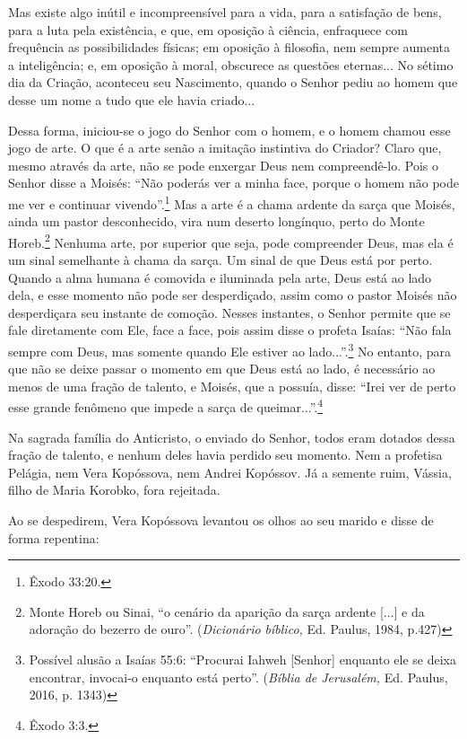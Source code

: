 Mas existe algo inútil e incompreensível para a vida, para a satisfação
de bens, para a luta pela existência, e que, em oposição à ciência,
enfraquece com frequência as possibilidades físicas; em oposição à
filosofia, nem sempre aumenta a inteligência; e, em oposição à moral,
obscurece as questões eternas... No sétimo dia da Criação, aconteceu seu
Nascimento, quando o Senhor pediu ao homem que desse um nome a tudo que
ele havia criado...

Dessa forma, iniciou-se o jogo do Senhor com o homem, e o homem chamou
esse jogo de arte. O que é a arte senão a imitação instintiva do
Criador? Claro que, mesmo através da arte, não se pode enxergar Deus nem
compreendê-lo. Pois o Senhor disse a Moisés: ``Não poderás ver a minha
face, porque o homem não pode me ver e continuar vivendo''.\footnote{Êxodo
  33:20.} Mas a arte é a chama ardente da sarça que Moisés, ainda um
pastor desconhecido, vira num deserto longínquo, perto do Monte
Horeb.\footnote{Monte Horeb ou Sinai, ``o cenário da aparição da sarça
  ardente {[}...{]} e da adoração do bezerro de ouro''.
  (\emph{Dicionário bíblico,} Ed. Paulus, 1984, p.427)} Nenhuma arte,
por superior que seja, pode compreender Deus, mas ela é um sinal
semelhante à chama da sarça. Um sinal de que Deus está por perto. Quando
a alma humana é comovida e iluminada pela arte, Deus está ao lado dela,
e esse momento não pode ser desperdiçado, assim como o pastor Moisés não
desperdiçara seu instante de comoção. Nesses instantes, o Senhor permite
que se fale diretamente com Ele, face a face, pois assim disse o profeta
Isaías: ``Não fala sempre com Deus, mas somente quando Ele estiver ao
lado...''.\footnote{Possível alusão a Isaías 55:6: ``Procurai Iahweh
  {[}Senhor{]} enquanto ele se deixa encontrar, invocai-o enquanto está
  perto''. (\emph{Bíblia de Jerusalém,} Ed. Paulus, 2016, p. 1343)} No
entanto, para que não se deixe passar o momento em que Deus está ao
lado, é necessário ao menos de uma fração de talento, e Moisés, que a
possuía, disse: ``Irei ver de perto esse grande fenômeno que impede a
sarça de queimar...''.\footnote{Êxodo 3:3.}

Na sagrada família do Anticristo, o enviado do Senhor, todos eram
dotados dessa fração de talento, e nenhum deles havia perdido seu
momento. Nem a profetisa Pelágia, nem Vera Kopóssova, nem Andrei
Kopóssov. Já a semente ruim, Vássia, filho de Maria Korobko, fora
rejeitada.

Ao se despedirem, Vera Kopóssova levantou os olhos ao seu marido e disse
de forma repentina:

